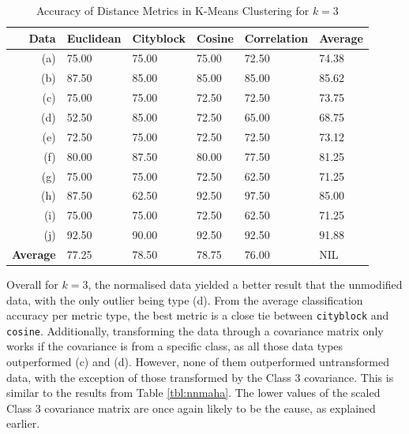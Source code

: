 \documentclass[a4paper, 10pt, conference]{ieeeconf}
\begin{document}
\begin{table}[!ht]
\centering
\caption{Accuracy of Distance Metrics in K-Means Clustering for $k = 3$}
\label{tbl:k3}
\begin{tabular}{|r|lllll|}
\hline
\textbf{Data} & \textbf{Euclidean} & \textbf{Cityblock} & \textbf{Cosine} & \textbf{Correlation} & \textbf{Average} \\ \hline
(a) & 75.00 & 75.00 & 75.00 & 72.50 & 74.38\\
(b) & 87.50 & 85.00 & 85.00 & 85.00 & 85.62\\
(c) & 75.00 & 75.00 & 72.50 & 72.50 & 73.75\\
(d) & 52.50 & 85.00 & 72.50 & 65.00 & 68.75\\
(e) & 72.50 & 75.00 & 72.50 & 72.50 & 73.12\\
(f) & 80.00 & 87.50 & 80.00 & 77.50 & 81.25\\
(g) & 75.00 & 75.00 & 72.50 & 62.50 & 71.25\\
(h) & 87.50 & 62.50 & 92.50 & 97.50 & 85.00\\
(i) & 75.00 & 75.00 & 72.50 & 62.50 & 71.25\\
(j) & 92.50 & 90.00 & 92.50 & 92.50 & 91.88\\
\textbf{Average} & 77.25 & 78.50 & 78.75 & 76.00 & NIL \\ \hline
\end{tabular}
\end{table}

Overall for $k=3$, the normalised data yielded a better result that the unmodified data, with the only outlier being type (d). From the average classification accuracy per metric type, the best metric is a close tie between \texttt{cityblock} and \texttt{cosine}. Additionally, transforming the data through a covariance matrix only works if the covariance is from a specific class, as all those data types outperformed (c) and (d). However, none of them outperformed untransformed data, with the exception of those transformed by the Class 3 covariance. This is similar to the results from Table \ref{tbl:nnmaha}. The lower values of the scaled Class 3 covariance matrix are once again likely to be the cause, as explained earlier.
\end{document}
